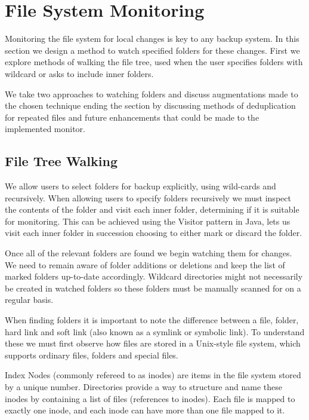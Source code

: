 \documentclass[11pt, a4paper, twoside]{report}
\begin{document}
\section{File System Monitoring}

Monitoring the file system for local changes is key to any backup system. In this section we design a method to watch specified folders for these changes. First we explore methods of walking the file tree, used when the user specifies folders with wildcard or asks to include inner folders.

We take two approaches to watching folders and discuss augmentations made to the chosen technique ending the section by discussing methods of deduplication for repeated files and future enhancements that could be made to the implemented monitor.

\subsection{File Tree Walking}

We allow users to select folders for backup explicitly, using wild-cards and recursively. When allowing users to specify folders recursively we must inspect the contents of the folder and visit each inner folder, determining if it is suitable for monitoring. This can be achieved using the Visitor pattern in Java, lets us visit each inner folder in succession choosing to either mark or discard the folder. \citep{sugrue2010visitor}

Once all of the relevant folders are found we begin watching them for changes. We need to remain aware of folder additions or deletions and keep the list of marked folders up-to-date accordingly. Wildcard directories might not necessarily be created in watched folders so these folders must be manually scanned for on a regular basis.

When finding folders it is important to note the difference between a file, folder, hard link and soft link (also known as a symlink or symbolic link). To understand these we must first observe how files are stored in a Unix-style file system, which supports ordinary files, folders and special files.

Index Nodes (commonly refereed to as inodes) are items in the file system stored by a unique number. Directories provide a way to structure and name these inodes by containing a list of files (references to inodes). Each file is mapped to exactly one inode, and each inode can have more than one file mapped to it. \citep{bar2001linux}
\end{document}

